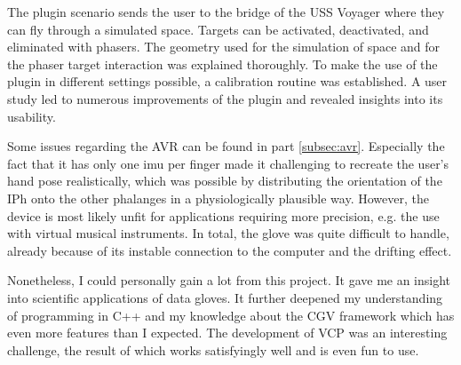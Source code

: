 \documentclass[hyperref, bachelorofscience]{cgvpub}
\begin{document}
The plugin scenario sends the user to the bridge of the USS Voyager where they can fly through a simulated space. Targets can be activated, deactivated, and eliminated with phasers. The geometry used for the simulation of space and for the phaser target interaction was explained thoroughly. To make the use of the plugin in different settings possible, a calibration routine was established. A user study led to numerous improvements of the plugin and revealed insights into its usability.

Some issues regarding the \Gls{AVR} can be found in part \ref{subsec:avr}. Especially the fact that it has only one \acrshort{imu} per finger made it challenging to recreate the user's hand pose realistically, which was possible by distributing the orientation of the \gls{IPh} onto the other phalanges in a physiologically plausible way. However, the device is most likely unfit for applications requiring more precision, e.g. the use with virtual musical instruments. In total, the glove was quite difficult to handle, already because of its instable connection to the computer and the drifting effect. 

Nonetheless, I could personally gain a lot from this project. It gave me an insight into scientific applications of data gloves. It  further deepened my understanding of programming in C++ and my knowledge about the \gls{CGV} framework which has even more features than I expected. The development of \gls{VCP} was an interesting challenge, the result of which works satisfyingly well and is even fun to use.

\printglossary[type=gloss_terms]
\printglossary[type=gloss_acr]
\end{document}
